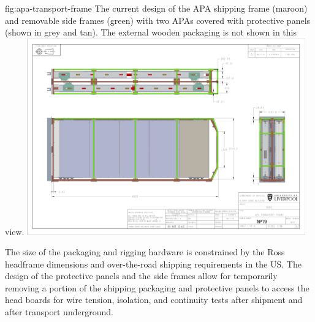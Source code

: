 \begin{dunefigure}{fig:apa-transport-frame}
{The current design of the APA shipping frame (maroon) and removable side frames (green) with two APAs covered with protective panels (shown in grey and tan). The external wooden packaging is not shown in this view.}  
\includegraphics[width=0.9\textwidth]{graphics/sp-apa-transport-box-drawing.png} 
\end{dunefigure}

The size of the packaging and rigging hardware is constrained by the Ross headframe dimensions and over-the-road shipping requirements in the US. The design of the protective panels and the side frames allow for temporarily removing a portion of the shipping packaging and protective panels to access the  head boards for wire tension, isolation, and continuity tests after shipment and after transport underground. 

